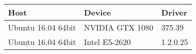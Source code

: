 \begin{tabular}{lll}
\toprule
               Host &           Device &    Driver \\
\midrule
 Ubuntu 16.04 64bit &  NVIDIA GTX 1080 &    375.39 \\
 Ubuntu 16.04 64bit &    Intel E5-2620 &  1.2.0.25 \\
\bottomrule
\end{tabular}
